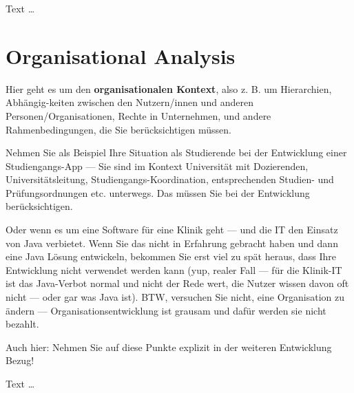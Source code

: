 \documentclass[11pt,a4paper,english]{scrreprt}
\newenvironment{comment}
  {\par\medskip
   \begingroup\color{olive}%
   }
 {\endgroup
  \medskip}
\begin{document}
Text \dots

\section{Organisational Analysis}
\begin{comment}
Hier geht es um den \textbf{organisationalen Kontext}, also z. B. um Hierarchien, Abhängig-keiten zwischen den Nutzern/innen und anderen Personen/Organisationen, Rechte in Unternehmen, und andere Rahmenbedingungen, die Sie berücksichtigen müssen.

Nehmen Sie als Beispiel Ihre Situation als Studierende bei der Entwicklung einer Studiengangs-App — Sie sind im Kontext Universität mit Dozierenden, Universitätsleitung, Studiengangs-Koordination, entsprechenden Studien- und Prüfungsordnungen etc. unterwegs. Das müssen Sie bei der Entwicklung berücksichtigen.

Oder wenn es um eine Software für eine Klinik geht — und die IT den Einsatz von Java verbietet. Wenn Sie das nicht in Erfahrung gebracht haben und dann eine Java Lösung entwickeln, bekommen Sie erst viel zu spät heraus, dass Ihre Entwicklung nicht verwendet werden kann (yup, realer Fall — für die Klinik-IT ist das Java-Verbot normal und nicht der Rede wert, die Nutzer wissen davon oft nicht — oder gar was Java ist). BTW, versuchen Sie nicht, eine Organisation zu ändern — Organisationsentwicklung ist grausam und dafür werden sie nicht bezahlt.

Auch hier: Nehmen Sie auf diese Punkte explizit in der weiteren Entwicklung Bezug!
\end{comment}

Text \dots
\end{document}
